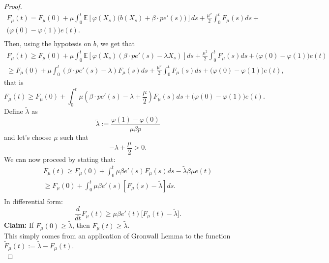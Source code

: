 \documentclass[11pt, a4paper]{article}
\begin{document}
\begin{proof}
\begin{multline*}
F_\mu(t)=F_\mu(0)+\mu\int_0^t\mathbb{E}\left[\varphi(X_s) \Big( b(X_s) + \beta\cdot p e'(s) \Big) \right]ds+\frac{\mu^2}{2}\int_0^t F_\mu(s)ds+\\
\Big(\varphi(0)-\varphi(1)\Big)e(t).\\
\end{multline*}
Then, using the hypotesis on $b$, we get that
\begin{multline*}
F_\mu(t)\geq F_\mu(0)+\mu\int_0^t\mathbb{E}\left[\varphi(X_s) (\beta \cdot p e'(s)-\lambda X_s )\right]ds+\frac{\mu^2}{2}\int_0^t F_\mu(s)ds+\Big(\varphi(0)-\varphi(1)\Big)e(t) \nonumber\\
\geq F_\mu(0)+\mu\int_0^t(\beta \cdot p e'(s)-\lambda )F_\mu(s)ds+\frac{\mu^2}{2}\int_0^t F_\mu(s)ds+\Big(\varphi(0)-\varphi(1)\Big)e(t),
\end{multline*} that is 
\begin{equation} \label{eq_ret_1} F_\mu(t) \geq F_\mu(0)+\int_0^t\mu\left(\beta\cdot p e'(s)-\lambda+\frac{\mu}{2}\right)F_\mu(s)ds+\Big(\varphi(0)-\varphi(1)\Big)e(t). \end{equation}
Define $\tilde{\lambda}$ as
\[\tilde{\lambda} := \frac{\varphi(1)-\varphi(0)}{\mu\beta p} \]
and let's choose $\mu$ such that
\[-\lambda+\frac{\mu}{2}>0.\]
We can now proceed by stating that:
\begin{multline*}
F_\mu(t) \geq  F_\mu(0) + \int_0^t \mu \beta e'(s)F_\mu(s)ds-\tilde{\lambda}\beta\mu e(t)\\
\geq F_\mu(0)+\int_0^t\mu\beta e'(s)[F_\mu(s)-\tilde{\lambda}]ds.\\
\end{multline*}
In differential form:
\begin{equation}
\frac{d}{dt}F_\mu(t)\geq \mu\beta e'(t)\Big[F_\mu(t)-\tilde{\lambda}\Big].
\end{equation}
\textbf{Claim:} If $F_\mu(0)\geq \tilde{\lambda}$, then $F_\mu(t)\geq \tilde{\lambda}$. \\
This simply comes from an application of Gronwall Lemma to the function $\tilde{F}_\mu(t) := \tilde{\lambda} - F_\mu(t)$. \\


\end{proof}
\end{document}
